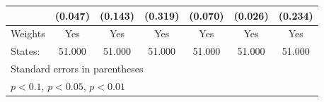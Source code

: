 {\begin{tabular}{l*{6}{c}}
            &     (0.047)         &     (0.143)         &     (0.319)         &     (0.070)         &     (0.026)         &     (0.234)         \\
\hline
Weights     &         Yes         &         Yes         &         Yes         &         Yes         &         Yes         &         Yes         \\
States:     &      51.000         &      51.000         &      51.000         &      51.000         &      51.000         &      51.000         \\
\hline\hline
\multicolumn{7}{l}{\footnotesize Standard errors in parentheses}\\
\multicolumn{7}{l}{\footnotesize \sym{*} \(p<0.1\), \sym{**} \(p<0.05\), \sym{***} \(p<0.01\)}\\
\end{tabular}
}
